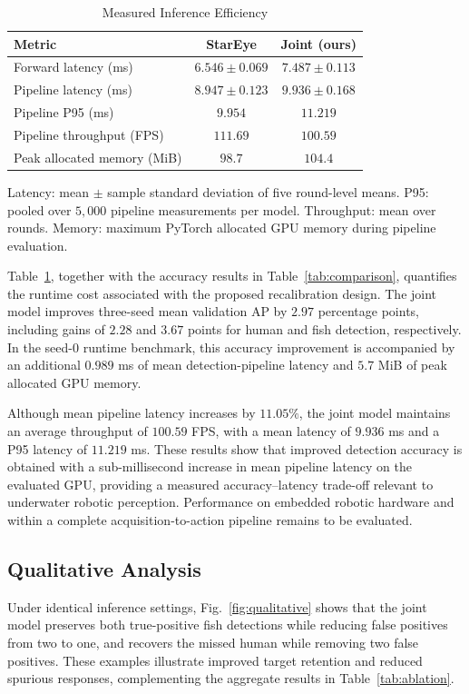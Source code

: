 \documentclass[letterpaper,10pt,conference]{ieeeconf}
\begin{document}
\begin{table}[!t]
\centering
\caption{Measured Inference Efficiency}
\label{tab:runtime}
\setlength{\tabcolsep}{3.2pt}
\scriptsize
\begin{tabular}{lcc}
\toprule
Metric & StarEye & Joint (ours)\\
\midrule
Forward latency (ms)
& \(6.546 \pm 0.069\) & \(7.487 \pm 0.113\)\\
Pipeline latency (ms)
& \(8.947 \pm 0.123\) & \(9.936 \pm 0.168\)\\
Pipeline P95 (ms)
& \(9.954\) & \(11.219\)\\
Pipeline throughput (FPS)
& \(111.69\) & \(100.59\)\\
Peak allocated memory (MiB)
& \(98.7\) & \(104.4\)\\
\bottomrule
\end{tabular}
\par\vspace{1mm}
\parbox{\linewidth}{\centering\footnotesize
Latency: mean \(\pm\) sample standard deviation of five
round-level means.
P95: pooled over \(5{,}000\) pipeline measurements per model.
Throughput: mean over rounds.
Memory: maximum PyTorch allocated GPU memory
during pipeline evaluation.}
\end{table}

Table~\ref{tab:runtime}, together with the accuracy results
in Table~\ref{tab:comparison}, quantifies the runtime cost
associated with the proposed recalibration design.
The joint model improves three-seed mean validation AP
by \(2.97\) percentage points, including gains of \(2.28\)
and \(3.67\) points for human and fish detection, respectively.
In the seed-0 runtime benchmark, this accuracy improvement
is accompanied by an additional \(0.989\) ms of mean
detection-pipeline latency and \(5.7\) MiB of peak allocated
GPU memory.

Although mean pipeline latency increases by \(11.05\%\),
the joint model maintains an average throughput of
\(100.59\) FPS, with a mean latency of \(9.936\) ms
and a P95 latency of \(11.219\) ms.
These results show that improved detection accuracy is
obtained with a sub-millisecond increase in mean pipeline
latency on the evaluated GPU, providing a measured
accuracy--latency trade-off relevant to underwater robotic
perception. Performance on embedded robotic hardware
and within a complete acquisition-to-action pipeline
remains to be evaluated.

\subsection{Qualitative Analysis}
Under identical inference settings, Fig.~\ref{fig:qualitative} shows that the
joint model preserves both true-positive fish detections while reducing false
positives from two to one, and recovers the missed human while removing two
false positives. These examples illustrate improved target retention and
reduced spurious responses, complementing the aggregate results in
Table~\ref{tab:ablation}.
\end{document}
